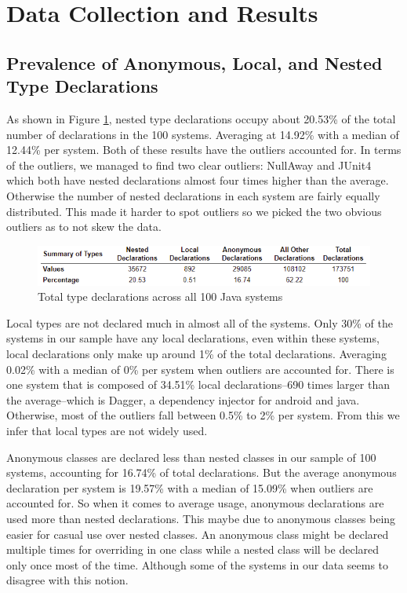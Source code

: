 \documentclass[12p]{article}
\begin{document}
\section{Data Collection and Results}
\subsection{Prevalence of Anonymous, Local, and Nested Type Declarations}


As shown in Figure \ref{fig:Declarations},  nested type declarations occupy about 20.53\% of the total number of declarations in the 100 systems. Averaging at 14.92\% with a median of 12.44\% per system. Both of these results have the outliers accounted for. In terms of the outliers, we managed to find two clear outliers: NullAway and JUnit4 which both have nested declarations almost four times higher than the average. Otherwise the number of nested declarations in each system are fairly equally distributed. This made it harder to spot outliers so we picked the two obvious outliers as to not skew the data.

\begin{figure}[h]
  \begin{center}
    \includegraphics{Declarations.PNG}
    \caption{Total type declarations across all 100 Java systems}
    \label{fig:Declarations}
  \end{center}
\end{figure}

Local types are not declared much in almost all of the systems. Only 30\% of the systems in our sample have any local declarations, even within these systems, local declarations only make up around 1\% of the total declarations. Averaging 0.02\% with a median of 0\% per system when outliers are accounted for. There is one system that is composed of 34.51\% local declarations--690 times larger than the average--which is Dagger, a dependency injector for android and java. Otherwise, most of the outliers fall between 0.5\% to 2\% per system. From this we infer that local types are not widely used.

Anonymous classes are declared less than nested classes in our sample of 100 systems, accounting for 16.74\% of total declarations. But the average anonymous declaration per system is 19.57\% with a median of 15.09\% when outliers are accounted for. So when it comes to average usage, anonymous declarations are used more than nested declarations. This maybe due to anonymous classes being easier for casual use over nested classes. An anonymous class might be declared multiple times for overriding in one class while a nested class will be declared only once most of the time. Although some of the systems in our data seems to disagree with this notion.
\end{document}
